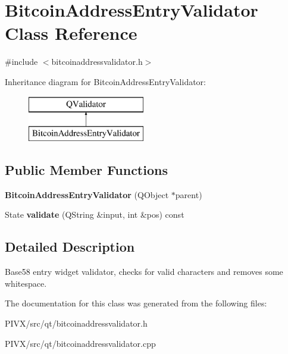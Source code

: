 \hypertarget{class_bitcoin_address_entry_validator}{}\section{Bitcoin\+Address\+Entry\+Validator Class Reference}
\label{class_bitcoin_address_entry_validator}


{\ttfamily \#include $<$bitcoinaddressvalidator.\+h$>$}

Inheritance diagram for Bitcoin\+Address\+Entry\+Validator\+:\begin{figure}[H]
\begin{center}
\leavevmode
\includegraphics[height=2.000000cm]{class_bitcoin_address_entry_validator}
\end{center}
\end{figure}
\subsection*{Public Member Functions}
\begin{DoxyCompactItemize}
\item 
\mbox{\label{class_bitcoin_address_entry_validator_ab1098be26569477a372790674841afe9}} 
{\bfseries Bitcoin\+Address\+Entry\+Validator} (Q\+Object $\ast$parent)
\item 
\mbox{\label{class_bitcoin_address_entry_validator_ab7420aad3fd2664328ce5618ee60b073}} 
State {\bfseries validate} (Q\+String \&input, int \&pos) const
\end{DoxyCompactItemize}


\subsection{Detailed Description}
Base58 entry widget validator, checks for valid characters and removes some whitespace. 

The documentation for this class was generated from the following files\+:\begin{DoxyCompactItemize}
\item 
P\+I\+V\+X/src/qt/bitcoinaddressvalidator.\+h\item 
P\+I\+V\+X/src/qt/bitcoinaddressvalidator.\+cpp\end{DoxyCompactItemize}
